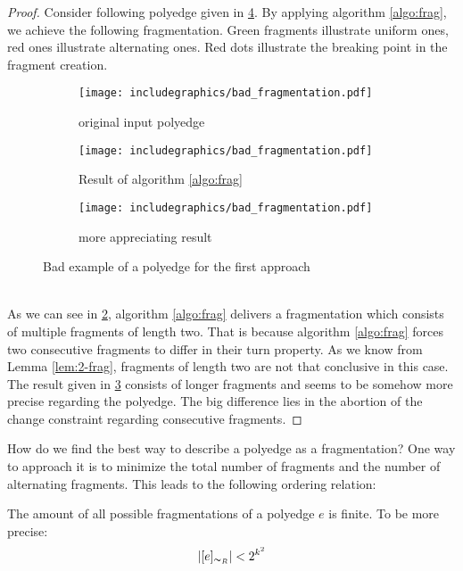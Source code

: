 \begin{proof}
	Consider following polyedge given in \ref{im:bad_frag}. By applying algorithm \ref{algo:frag}, we achieve the following fragmentation. Green fragments illustrate uniform ones, red ones illustrate alternating ones. Red dots illustrate the breaking point in the fragment creation.
	\\
	\begin{figure}[h]
		\centering
		\begin{subfigure}{0.3\textwidth}
			\centering
			\texttt{[image: includegraphics/bad\_fragmentation.pdf]}
			\caption{original input polyedge}\label{im:bad_frag1}
		\end{subfigure}
		\begin{subfigure}{0.3\textwidth}
			\centering
			\texttt{[image: includegraphics/bad\_fragmentation.pdf]}
			
			\caption{Result of algorithm \ref{algo:frag}}\label{im:bad_frag2}
		\end{subfigure}
		\begin{subfigure}{0.3\textwidth}
			\centering
			\texttt{[image: includegraphics/bad\_fragmentation.pdf]}
			
			\caption{more appreciating result}\label{im:bad_frag3}
		\end{subfigure}
		\caption{Bad example of a polyedge for the first approach}
		\label{im:bad_frag}
	\end{figure}
	\\
	As we can see in \ref{im:bad_frag2}, algorithm \ref{algo:frag} delivers a fragmentation which consists of multiple fragments of length two. That is because algorithm \ref{algo:frag} forces two consecutive fragments to differ in their turn property. As we know from Lemma \ref{lem:2-frag}, fragments of length two are not that conclusive in this case. The result given in \ref{im:bad_frag3} consists of longer fragments and seems to be somehow more precise regarding the polyedge. The big difference lies in the abortion of the change constraint regarding consecutive fragments.
\end{proof}
How do we find the best way to describe a polyedge as a fragmentation? One way to approach it is to minimize the total number of fragments and the number of alternating fragments. This leads to the following ordering relation:
\begin{lemma}
	The amount of all possible fragmentations of a polyedge $e$ is finite. To be more precise: $$|[e]_{\thicksim_R}| < 2^{k^2}$$
\end{lemma}
